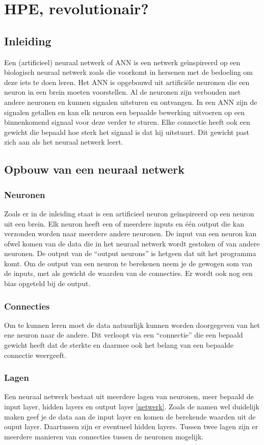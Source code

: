 \documentclass{article}
\begin{document}
\section{HPE, revolutionair?}
\subsection*{Inleiding}
Een (artificieel) neuraal netwerk of ANN is een netwerk geïnspireerd op een biologisch neuraal netwerk zoals die voorkomt in hersenen met de bedoeling om deze iets te doen leren. Het ANN is opgebouwd uit artificiële neuronen die een neuron in een brein moeten voorstellen. Al de neuronen zijn verbonden met andere neuronen en kunnen signalen uitsturen en ontvangen. In een ANN zijn de signalen getallen en kan elk neuron een bepaalde bewerking uitvoeren op een binnenkomend signaal voor deze verder te sturen. Elke connectie heeft ook een gewicht die bepaald hoe sterk het signaal is dat hij uitstuurt. Dit gewicht past zich aan als het neuraal netwerk leert. 

\subsection{Opbouw van een neuraal netwerk}
\subsubsection{Neuronen}
Zoals er in de inleiding staat is een artificieel neuron geïnspireerd op een neuron uit een brein. Elk neuron heeft een of meerdere inputs en één output die kan verzonden worden naar meerdere andere neuronen. De input van een neuron kan ofwel komen van de data die in het neuraal netwerk wordt gestoken of van andere neuronen. De output van de “output neurons” is hetgeen dat uit het programma komt. Om de output van een neuron te berekenen neem je de gewogen som van de inputs, met als gewicht de waarden van de connecties. Er wordt ook nog een bias opgeteld bij de output.

\subsubsection{Connecties}
Om te kunnen leren moet de data natuurlijk kunnen worden doorgegeven van het ene neuron naar de andere. Dit verloopt via een “connectie” die een bepaald gewicht heeft dat de sterkte en daarmee ook het belang van een bepaalde connectie weergeeft.

\subsubsection{Lagen}
Een neuraal netwerk bestaat uit meerdere lagen van neuronen, meer bepaald de input layer, hidden layers en output layer \ref{netwerk}. Zoals de namen wel duidelijk maken geef je de data aan de input layer en komen de berekende waarden uit de ouput layer. Daartussen zijn er eventueel hidden layers. Tussen twee lagen zijn er meerdere manieren van connecties tussen de neuronen mogelijk.
\end{document}
